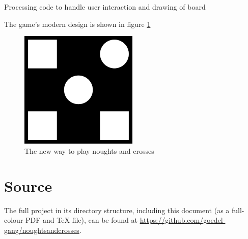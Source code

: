 \documentclass[fleqn,a4paper,11pt]{article}
\begin{document}
\begin{longlisting}
\inputminted{python}{../noughtsandcrosses.pyde}
\caption{Processing code to handle user interaction and drawing of board}\label{lst:procpy}
\end{longlisting}

    The game's modern design is shown in figure \ref{fig:proc}

\begin{figure}[H]
\begin{center}
\includegraphics[width=0.5\textwidth]{../win_screenshot_20180712_110639.png}
\caption{The new way to play noughts and crosses}\label{fig:proc}
\end{center}
\end{figure}

    \section{Source}

    The full project in its directory structure, including this document (as a
    full-colour PDF and \TeX{} file), can be found at
    \url{https://github.com/goedel-gang/noughtsandcrosses}.
\end{document}
